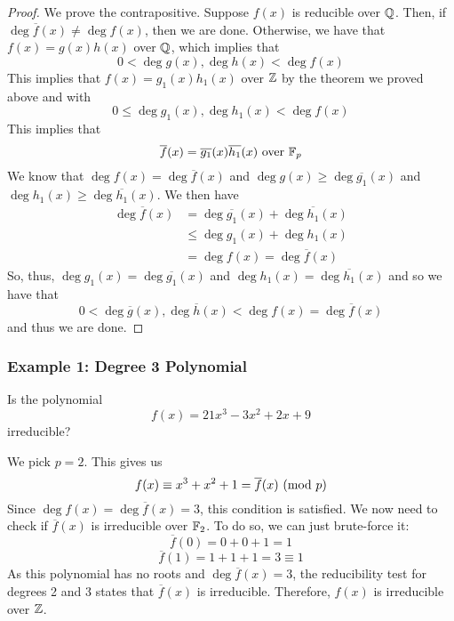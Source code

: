 \documentclass[letterpaper]{article}
\begin{document}
\begin{mdframed}[]
    \begin{proof}
        We prove the contrapositive. Suppose $f(x)$ is reducible over $\mathbb{Q}$. Then, if $\deg \overline{f}(x) \neq \deg f(x)$, then we are done. Otherwise, we have that $f(x) = g(x) h(x)$ over $\mathbb{Q}$, which implies that 
        \[0 < \deg g(x), \deg h(x) < \deg f(x)\]
        This implies that $f(x) = g_1 (x) h_1 (x)$ over $\mathbb{Z}$ by the theorem we proved above and with
        \[0 \leq \deg g_1 (x), \deg h_1 (x) < \deg f(x)\]
        This implies that 
        \[\overline{f}(x) = \overline{g_1}(x) \overline{h_1}(x) \text{ over } \mathbb{F}_p\]
        We know that $\deg f(x) = \deg \overline{f}(x)$ and $\deg g(x) \geq \deg \overline{g_1}(x)$ and $\deg h_1 (x) \geq \deg \overline{h_1}(x)$. We then have 
        \begin{equation*}
            \begin{aligned}
                \deg \overline{f}(x) &= \deg \overline{g_1}(x) + \deg \overline{h_1}(x) \\ 
                    &\leq \deg g_1 (x) + \deg h_1 (x) \\ 
                    &= \deg f(x) = \deg \overline{f}(x)
            \end{aligned}
        \end{equation*}
        So, thus, $\deg g_1 (x) = \deg \overline{g_1}(x)$ and $\deg h_1 (x) = \deg \overline{h_1}(x)$ and so we have that 
        \[0 < \deg \overline{g}(x), \deg \overline{h}(x) < \deg f(x) = \deg \overline{f}(x)\]
        and thus we are done. 
    \end{proof}
\end{mdframed}

\subsubsection{Example 1: Degree 3 Polynomial}
Is the polynomial
\[f(x) = 21x^3 - 3x^2 + 2x + 9\]
irreducible?

\begin{mdframed}[]
    We pick $p = 2$. This gives us 
    \[f(x) \equiv x^3 + x^2 + 1 = \overline{f}(x) \ (\mathrm{mod}\ p)\]
    Since $\deg f(x) = \deg \overline{f}(x) = 3$, this condition is satisfied. We now need to check if $\overline{f}(x)$ is irreducible over $\mathbb{F}_2$. To do so, we can just brute-force it:
    \[\overline{f}(0) = 0 + 0 + 1 = 1\]
    \[\overline{f}(1) = 1 + 1 + 1 = 3 \equiv 1\]
    As this polynomial has no roots and $\deg \overline{f}(x) = 3$, the reducibility test for degrees 2 and 3 states that $\overline{f}(x)$ is irreducible. Therefore, $f(x)$ is irreducible over $\mathbb{Z}$. 
\end{mdframed}
\end{document}
